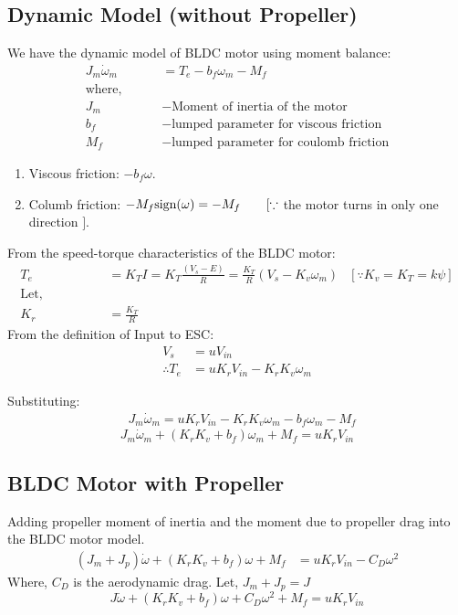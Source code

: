 \subsection{Dynamic Model (without Propeller)}
We have the dynamic model of BLDC motor using moment balance:
\begin{align*}
    J_m \dot \omega_m &= T_e - b_f \omega_m - M_f\\
    \text{where, } \qquad &\\
    J_m &- \text{Moment of inertia of the motor}\\
    b_f &- \text{lumped parameter for viscous friction}\\
    M_f &- \text{lumped parameter for coulomb friction}
\end{align*}
\begin{enumerate}
    \item Viscous friction: $-b_f \omega$.
    \item Columb friction: $-M_{f} \text{sign}(\omega) = -M_{f} \qquad [\because$ the motor turns in only one direction $]$.
\end{enumerate}

\medskip

From the speed-torque characteristics of the BLDC motor:
\begin{align*}
    T_e &= K_T I = K_T \frac{(V_s - E)}{R} = \frac{K_T}{R} (V_s - K_v \omega_m)  & [\because K_v = K_T = k \psi]\\
    \text{Let, }\qquad \qquad &\\
    K_r &= \frac{K_T}{R}
\end{align*}
From the definition of Input to ESC:
\begin{align*}
    V_s &= u V_{in}\\
    \therefore T_e &= u K_r V_{in} - K_r K_v \omega_m
\end{align*}

Substituting:
\begin{align*}
    &J_m \dot \omega_m = u K_r V_{in}  - K_rK_v \omega_m  - b_f \omega_m - M_f
\end{align*}
\begin{equation}
    \boxed{
    J_m \dot \omega_m + (K_r K_v  + b_f) \omega_m + M_f = u K_r V_{in}
    }
    \label{eqn:no_prop}
\end{equation}

\subsection{BLDC Motor with Propeller}
Adding propeller moment of inertia and the moment due to propeller drag into the BLDC motor model.
\begin{align*}
    (J_m + J_p) \dot \omega + (K_rK_v + b_f) \omega + M_f &= u K_r V_{in} - C_D \omega^2
\end{align*}
Where, $C_D$ is the aerodynamic drag. Let, $J_m + J_p = J$
\begin{equation}
    \boxed{
    J\dot \omega + (K_rK_v + b_f) \omega + C_D \omega^2 + M_f = u K_r V_{in}
    }
    \label{eqn:prop}
\end{equation}


